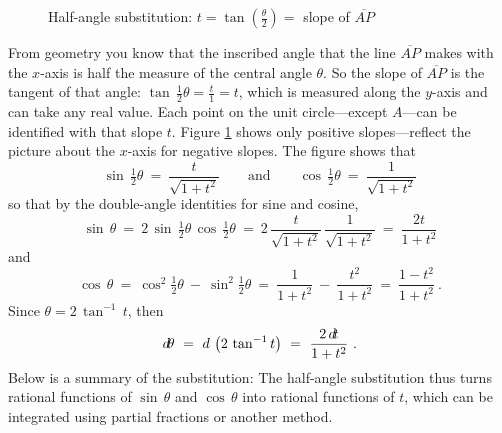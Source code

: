 \begin{figure}[h]
{}
 \caption[]{\enskip Half-angle substitution:
  $t = \tan\left(\tfrac{\theta}{2}\right) = $ slope of $\overline{AP}$}
 \label{fig:circle3}
\end{figure}

\noindent From geometry you know that the inscribed angle that the line
$\overline{AP}$ makes with the $x$-axis is half the measure of the central angle
$\theta$. So the slope of $\overline{AP}$ is the tangent of that angle:
$\tan\,\frac{1}{2}\theta = \frac{t}{1} = t$, which is measured along
the $y$-axis and can take any real value. Each point on the unit circle---except
$A$---can be identified with that slope $t$.
\newpage
Figure \ref{fig:circle3} shows only positive slopes---reflect the picture about
the $x$-axis for negative slopes. The figure shows that
\[
\sin\,\tfrac{1}{2}\theta ~=~ \frac{t}{\sqrt{1+t^2}} \qquad\text{and}\qquad
\cos\,\tfrac{1}{2}\theta ~=~ \frac{1}{\sqrt{1+t^2}}
\]
so that by the double-angle identities for sine and cosine,
\[
\sin\,\theta ~=~ 2\,\sin\,\tfrac{1}{2}\theta\,\cos\,\tfrac{1}{2}\theta
~=~ 2\,\frac{t}{\sqrt{1+t^2}}\,\frac{1}{\sqrt{1+t^2}} ~=~ \frac{2t}{1+t^2}
\]
and
\[
\cos\,\theta ~=~ \cos^2 \tfrac{1}{2}\theta ~-~ \sin^2 \tfrac{1}{2}\theta
~=~ \frac{1}{1+t^2} ~-~ \frac{t^2}{1+t^2}  ~=~ \frac{1-t^2}{1+t^2} ~.
\]
Since $\theta = 2\,\tan^{-1} \,t$, then
\[
d\!\theta ~=~ d\,\left(2\,\tan^{-1} t\right) ~=~ \frac{2\,d\!t}{1+t^2} ~.
\]
Below is a summary of the substitution:
The half-angle substitution thus turns rational functions of $\sin\,\theta$ and
$\cos\,\theta$ into rational functions of $t$, which can be integrated using
partial fractions or another method.

